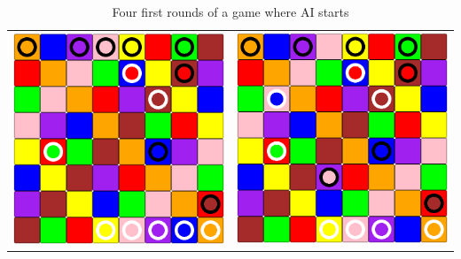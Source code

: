\documentclass[a4paper, 11pt]{beamer}
\begin{document}
\begin{frame}
\begin{table}[htbp]
\begin{tabular}{c c}
    \includegraphics[scale = 0.11]{mathieu2_5.png} & \includegraphics[scale = 0.11]{mathieu2_6.png} \\
  \end{tabular}
  \caption{Four first rounds of a game where AI starts}
 \end{table}
\end{frame}
\end{document}

